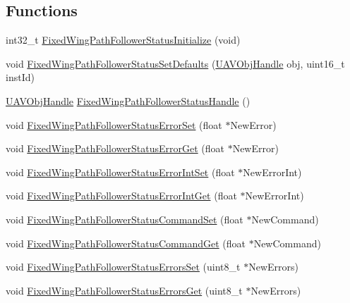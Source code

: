 \subsection*{\-Functions}
\begin{DoxyCompactItemize}
\item 
int32\-\_\-t \hyperlink{group___fixed_wing_path_follower_status_ga1e05804161dadde44c593238607f3144}{\-Fixed\-Wing\-Path\-Follower\-Status\-Initialize} (void)
\item 
void \hyperlink{group___fixed_wing_path_follower_status_ga70091af2f2ebb4bb59e4678291071962}{\-Fixed\-Wing\-Path\-Follower\-Status\-Set\-Defaults} (\hyperlink{targets_2_u_a_v_objects_2inc_2uavobjectmanager_8h_a279053e22be53ce9f895043aaeb91e3b}{\-U\-A\-V\-Obj\-Handle} obj, uint16\-\_\-t inst\-Id)
\item 
\hyperlink{targets_2_u_a_v_objects_2inc_2uavobjectmanager_8h_a279053e22be53ce9f895043aaeb91e3b}{\-U\-A\-V\-Obj\-Handle} \hyperlink{group___fixed_wing_path_follower_status_ga98c566d47a077f07b4145c38ed14c40e}{\-Fixed\-Wing\-Path\-Follower\-Status\-Handle} ()
\item 
void \hyperlink{group___fixed_wing_path_follower_status_ga388f219e251153c72381de523e29327a}{\-Fixed\-Wing\-Path\-Follower\-Status\-Error\-Set} (float $\ast$\-New\-Error)
\item 
void \hyperlink{group___fixed_wing_path_follower_status_ga1185d1204e9e91246c9432ea085105ae}{\-Fixed\-Wing\-Path\-Follower\-Status\-Error\-Get} (float $\ast$\-New\-Error)
\item 
void \hyperlink{group___fixed_wing_path_follower_status_gad8e77b64040dea108cec96700049d46b}{\-Fixed\-Wing\-Path\-Follower\-Status\-Error\-Int\-Set} (float $\ast$\-New\-Error\-Int)
\item 
void \hyperlink{group___fixed_wing_path_follower_status_ga87436ff9b45dc142e6e04f0dbab4c2f7}{\-Fixed\-Wing\-Path\-Follower\-Status\-Error\-Int\-Get} (float $\ast$\-New\-Error\-Int)
\item 
void \hyperlink{group___fixed_wing_path_follower_status_ga66cb98ff34f38810149cc2f0075ec008}{\-Fixed\-Wing\-Path\-Follower\-Status\-Command\-Set} (float $\ast$\-New\-Command)
\item 
void \hyperlink{group___fixed_wing_path_follower_status_ga5798ed25a6ba474bcdbb0bcf386ff4e5}{\-Fixed\-Wing\-Path\-Follower\-Status\-Command\-Get} (float $\ast$\-New\-Command)
\item 
void \hyperlink{group___fixed_wing_path_follower_status_ga2a1581c3fefad673ee3432c3d9963e77}{\-Fixed\-Wing\-Path\-Follower\-Status\-Errors\-Set} (uint8\-\_\-t $\ast$\-New\-Errors)
\item 
void \hyperlink{group___fixed_wing_path_follower_status_ga8660261fe41bde1cd9946babeca7cda2}{\-Fixed\-Wing\-Path\-Follower\-Status\-Errors\-Get} (uint8\-\_\-t $\ast$\-New\-Errors)
\end{DoxyCompactItemize}


